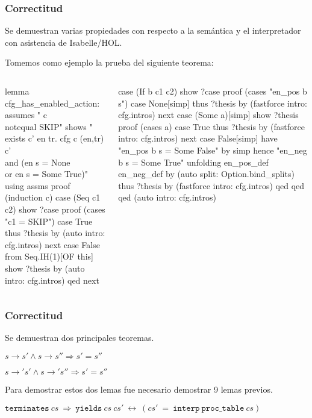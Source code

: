 \begin{frame}[fragile]
\frametitle{Correctitud}
\Fontvi

Se demuestran varias propiedades con respecto a la semántica y el interpretador con asistencia de Isabelle/HOL.

Tomemos como ejemplo la prueba del siguiente teorema:



\begin{columns}[t]
\begin{semiverbatim}
lemma cfg_has_enabled_action:
  assumes " c \\notequal SKIP"
  shows "\\exists c' en tr. cfg c (en,tr) c'
    \\and (en s = None \\or en s = Some True)" 
  using assms
proof (induction c)
  case (Seq c1 c2)
  show ?case
  proof (cases "c1 = SKIP")
    case True
    thus ?thesis by (auto intro: cfg.intros)
  next
    case False
    from Seq.IH(1)[OF this]
      show ?thesis by (auto intro: cfg.intros)
  qed
next
\end{semiverbatim}
\begin{semiverbatim}
  case (If b c1 c2)
  show ?case
  proof (cases "en_pos b s")
    case None[simp]
    thus ?thesis
      by (fastforce intro: cfg.intros)
  next
    case (Some a)[simp]
      show ?thesis
      proof (cases a)
        case True
        thus ?thesis
          by (fastforce intro: cfg.intros)
      next
        case False[simp]
        have "en_pos b s = Some False" by simp
        hence "en_neg b s = Some True"
          unfolding en_pos_def en_neg_def
          by (auto split: Option.bind_splits)
        thus ?thesis
          by (fastforce intro: cfg.intros)
      qed
  qed
qed (auto intro: cfg.intros)
\end{semiverbatim}

\end{columns}


\end{frame}

\begin{frame}
\frametitle{Correctitud}

Se demuestran dos principales teoremas.

\begin{theorem}
$s \rightarrow s' \land s \rightarrow s'' \Longrightarrow s' = s''$

$s \rightarrow' s' \land s \rightarrow' s'' \Longrightarrow s' = s''$
\end{theorem}

Para demostrar estos dos lemas fue necesario demostrar 9 lemas previos.


\begin{theorem}
$\mathtt{terminates}\ cs\ \Longrightarrow\ \mathtt{yields}\ cs\ cs'\ \longleftrightarrow\ (cs'\ =\ \mathtt{interp}\ \mathtt{proc\_table}\ cs)$
\end{theorem}

\end{frame}

